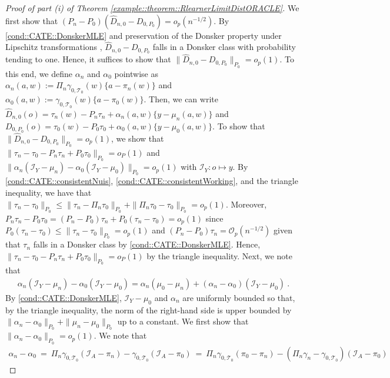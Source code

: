 \documentclass[11pt]{article}
\theoremstyle{definition}
\begin{document}
\begin{proof}[Proof of part (i) of Theorem   \ref{example::theorem::RlearnerLimitDistORACLE}]
We first show that $ (P_n-P_0)( \widehat D_{n,0}- D_{0,P_{0}} ) = o_p(n^{-1/2})$. By \ref{cond::CATE::DonskerMLE} and preservation of the Donsker property under Lipschitz transformations  \citep{vanderVaartWellner}, $\widehat D_{n,0}- D_{0,P_{0}}$ falls in a Donsker class with probability tending to one. Hence, it suffices to show that $\|  \widehat D_{n,0}- D_{0,P_{0}} \|_{P_0} = o_p(1)$. To this end, we define $\alpha_n$ and $\alpha_0$ pointwise as $\alpha_n(a,w):= \Pi_n\gamma_{0, \mathcal{T}_0}(w) \{a- \pi_n(w)\}$ and $\alpha_0(a,w):= \gamma_{0, \mathcal{T}_0}(w) \{a- \pi_0(w)\}$. Then, we can write $\widehat D_{n,0}(o) = \tau_n(w) - P_n \tau_n + \alpha_n(a,w)\{y - \mu_n(a,w)\}$ and $D_{0,P_0}(o) = \tau_0(w) - P_0 \tau_0 + \alpha_0(a,w)\{y - \mu_0(a,w)\}$. To show that $\|\widehat D_{n,0} - D_{0,P_0}\|_{P_0} = o_p(1)$, we show that $\|\tau_n - \tau_0 - P_n \tau_n + P_0 \tau_0 \|_{P_0} = o_P(1)$ and $\|\alpha_n(\mathcal{I}_Y - \mu_n) -\alpha_0(\mathcal{I}_Y - \mu_0) \|_{P_0} = o_p(1)$ with $\mathcal{I}_Y: o \mapsto y$. By \ref{cond::CATE::consistentNuis}, \ref{cond::CATE::consistentWorking}, and the triangle inequality, we have that $\|\tau_n -   \tau_0 \|_{P_0} \leq \|\tau_n -   \Pi_n \tau_0 \|_{P_0} + \|\Pi_n \tau_0 -   \tau_0 \|_{P_0} = o_p(1)$. Moreover, $P_n \tau_n - P_0 \tau_0 = (P_n - P_0) \tau_n + P_0(\tau_n - \tau_0) = o_p(1)$ since $P_0(\tau_n - \tau_0) \leq \|\tau_n - \tau_0 \|_{P_0}  = o_p(1)$ and $(P_n - P_0) \tau_n = \mathcal{O}_p(n^{-1/2})$ given that $\tau_n$ falls in a Donsker class by \ref{cond::CATE::DonskerMLE}. Hence, $\|\tau_n - \tau_0 - P_n \tau_n + P_0 \tau_0 \|_{P_0} = o_P(1)$ by the triangle inequality. Next, we note that 
\begin{align*}
    \alpha_n(\mathcal{I}_Y - \mu_n) -\alpha_0(\mathcal{I}_Y - \mu_0)   = \alpha_n(\mu_0 - \mu_n)  + (\alpha_n - \alpha_0)(\mathcal{I}_Y - \mu_0)\ .
\end{align*} 
By \ref{cond::CATE::DonskerMLE}, $\mathcal{I}_Y - \mu_0$ and $\alpha_n$ are uniformly bounded so that, by the triangle inequality, the norm of the right-hand side is upper bounded by $\|\alpha_n - \alpha_0 \|_{P_0} + \|\mu_n - \mu_0\|_{P_0}$ up to a constant. We first show that $\|\alpha_n - \alpha_0 \|_{P_0} = o_p(1)$. We note that
\begin{align*}
    \alpha_n - \alpha_0\ =\ \Pi_n \gamma_{0, \mathcal{T}_0}(\mathcal{I}_A - \pi_n) - \gamma_{0, \mathcal{T}_0}(\mathcal{I}_A - \pi_0)\  =\  \Pi_n \gamma_{0, \mathcal{T}_0}(\pi_0 - \pi_n) - (\Pi_n \gamma_n - \gamma_{0, \mathcal{T}_0})(\mathcal{I}_A- \pi_0)
\end{align*} 

\end{proof}
\end{document}
